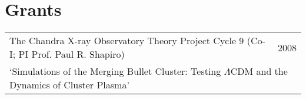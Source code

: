 \section*{Grants}

\hspace{0.05in}
\begin{tabular*}{159.2mm}{@{\extracolsep{\fill}}lr}
  The Chandra X-ray Observatory Theory Project Cycle 9 (Co-I; PI Prof. Paul R. Shapiro) & 2008\\
  \multicolumn{2}{l}{`Simulations of the Merging Bullet Cluster: Testing $\Lambda$CDM and the Dynamics of Cluster Plasma'}
\end{tabular*}




